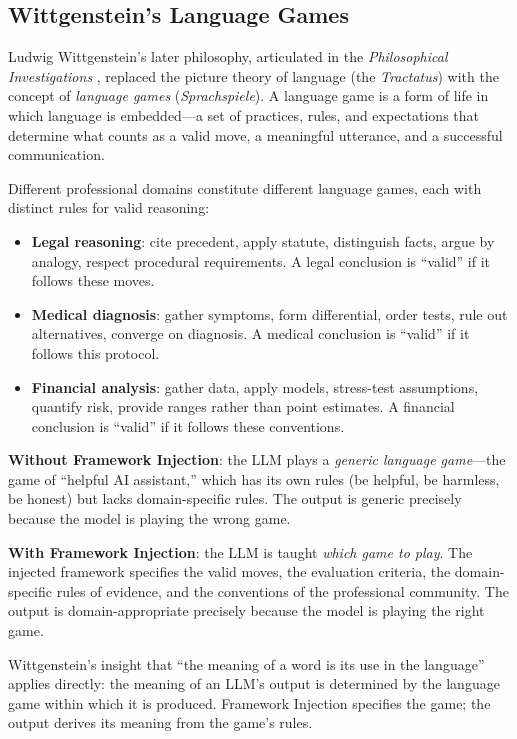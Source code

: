\documentclass[12pt,a4paper]{article}
\begin{document}
\subsection{Wittgenstein's Language Games}

Ludwig Wittgenstein's later philosophy, articulated in the \emph{Philosophical Investigations} \cite{wittgenstein1953}, replaced the picture theory of language (the \emph{Tractatus}) with the concept of \emph{language games} (\emph{Sprachspiele}). A language game is a form of life in which language is embedded---a set of practices, rules, and expectations that determine what counts as a valid move, a meaningful utterance, and a successful communication.

Different professional domains constitute different language games, each with distinct rules for valid reasoning:

\begin{itemize}
  \item \textbf{Legal reasoning}: cite precedent, apply statute, distinguish facts, argue by analogy, respect procedural requirements. A legal conclusion is ``valid'' if it follows these moves.
  \item \textbf{Medical diagnosis}: gather symptoms, form differential, order tests, rule out alternatives, converge on diagnosis. A medical conclusion is ``valid'' if it follows this protocol.
  \item \textbf{Financial analysis}: gather data, apply models, stress-test assumptions, quantify risk, provide ranges rather than point estimates. A financial conclusion is ``valid'' if it follows these conventions.
\end{itemize}

\textbf{Without Framework Injection}: the LLM plays a \emph{generic language game}---the game of ``helpful AI assistant,'' which has its own rules (be helpful, be harmless, be honest) but lacks domain-specific rules. The output is generic precisely because the model is playing the wrong game.

\textbf{With Framework Injection}: the LLM is taught \emph{which game to play}. The injected framework specifies the valid moves, the evaluation criteria, the domain-specific rules of evidence, and the conventions of the professional community. The output is domain-appropriate precisely because the model is playing the right game.

Wittgenstein's insight that ``the meaning of a word is its use in the language'' applies directly: the meaning of an LLM's output is determined by the language game within which it is produced. Framework Injection specifies the game; the output derives its meaning from the game's rules.
\end{document}

